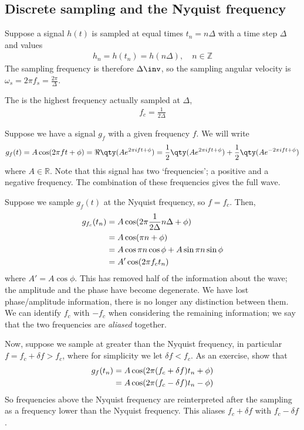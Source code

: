 \subsection{Discrete sampling and the Nyquist frequency}
Suppose a signal $h(t)$ is sampled at equal times $t_n = n\Delta$ with a time step $\Delta$ and values
\begin{align} \label{eq:8.36}
	h_n = h(t_n) = h(n\Delta),\quad n \in \mathbb{Z}
\end{align}
The sampling frequency is therefore $\Delta\inv$, so the sampling angular velocity is $\omega_s = 2\pi f_s = \frac{2\pi}{\Delta}$.

\begin{definition}
	The  is the highest frequency actually sampled at $\Delta$,
	\begin{align} \label{eq:8.37}
		f_c = \frac{1}{2 \Delta}
	\end{align}
\end{definition}

Suppose we have a signal $g_f$ with a given frequency $f$.
We will write
\begin{align} \label{eq:8.38}
	g_f(t) = A \cos(2\pi f t + \phi) = \Re \qty(A e^{2 \pi i f t + \phi}) = \frac{1}{2} \qty(A e^{2 \pi i f t + \phi}) + \frac{1}{2} \qty(A e^{-2 \pi i f t + \phi})
\end{align}
where $A \in \mathbb R$.
Note that this signal has two `frequencies'; a positive and a negative frequency.
The combination of these frequencies gives the full wave.

Suppose we sample $g_f(t)$ at the Nyquist frequency, so $f = f_c$.
Then,
\begin{align}
	g_{f_c}(t_n) & = A \cos(2 \pi \frac{1}{2\Delta} n \Delta + \phi) \notag \\
	& = A \cos(\pi n + \phi) \notag \\
	& = A \cos \pi n \cos \phi + A \sin \pi n \sin \phi \notag \\
	& = A' \cos(2\pi f_c t_n) \label{eq:8.39}
\end{align}
where $A' = A \cos \phi$.
This has removed half of the information about the wave; the amplitude and the phase have become degenerate.
We have lost phase/amplitude information, there is no longer any distinction between them.
We can identify $f_c$ with $-f_c$ when considering the remaining information; we say that the two frequencies are \textit{aliased} together.

Now, suppose we sample at greater than the Nyquist frequency, in particular $f = f_c + \delta f > f_c$, where for simplicity we let $\delta f < f_c$.
As an exercise, show that
\begin{align}
	g_f(t_n) &= A \cos(2\pi (f_c + \delta f)t_n + \phi) \notag \\
	&= A \cos(2\pi (f_c - \delta f)t_n - \phi) \label{eq:8.40}
\end{align}
So frequencies above the Nyquist frequency are reinterpreted after the sampling as a frequency lower than the Nyquist frequency.
This aliases $f_c + \delta f$ with $f_c - \delta f$.

